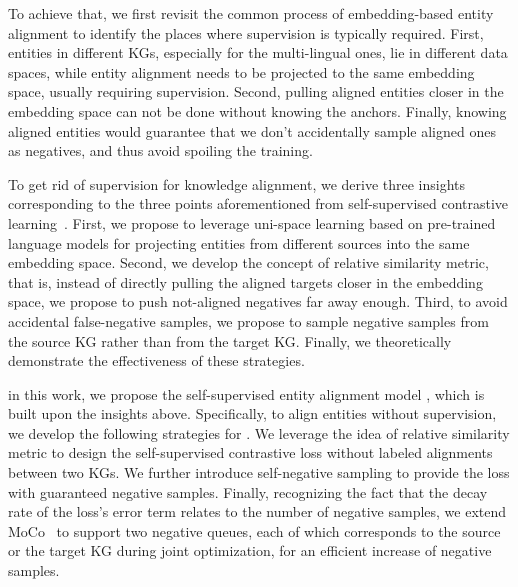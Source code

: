 {To achieve that, we first revisit the common process of embedding-based entity alignment to identify the places where supervision is typically required.  
First, entities in different KGs, especially for the multi-lingual ones, lie in different data spaces, while entity alignment needs to be projected to the same embedding space, usually requiring supervision. 
Second, pulling aligned entities closer in the embedding space can not be done without knowing the anchors. 
Finally, knowing aligned entities would guarantee that we don't accidentally sample aligned ones as negatives, and thus avoid spoiling the training. 

 To get rid of supervision for knowledge alignment, we derive three insights corresponding to the three points aforementioned from self-supervised contrastive learning~\cite{liu2020self,he2020momentum}. 
First, we propose to leverage uni-space learning based on pre-trained language models for projecting entities from different sources into the same embedding space. 
Second, we develop the concept of relative similarity metric, that is, instead of directly pulling the aligned targets closer in the embedding space, we propose to push not-aligned negatives far away enough.
Third, 
to avoid accidental false-negative samples, 
we propose to sample negative samples from the source KG rather than from the target KG. 
Finally, we theoretically demonstrate the effectiveness of these strategies.


 in this work, we propose the self-supervised entity alignment model \solution, which is built upon the insights above. 
Specifically, to align entities without supervision,  we develop the following strategies for \solution. 
We leverage the idea of relative similarity metric to design the self-supervised contrastive loss without labeled alignments between two KGs. 
We further introduce self-negative sampling to provide the loss with guaranteed negative samples. 
Finally, 
recognizing the fact that the decay rate of the loss's error term relates to the number of negative samples,
we extend MoCo~\cite{he2020momentum} to support two negative queues, each of which corresponds to the source or the target KG during joint optimization, for an efficient increase of negative samples.


}
